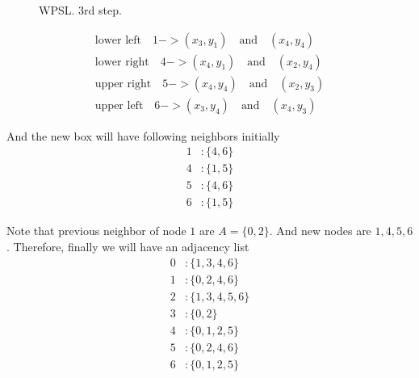 \documentclass[10pt,a4paper]{report}
\begin{document}
	\begin{figure}
		\centering
		\caption{WPSL. 3rd step.}
	\end{figure}

	\begin{align}
	\text{lower left}\quad 1 -> (x_3, y_1) \quad \text{and} \quad (x_4, y_4) \\		
	\text{lower right}\quad 4 -> (x_4, y_1) \quad \text{and} \quad (x_2, y_4) \\
	\text{upper right}\quad 	5 -> (x_4, y_4) \quad \text{and} \quad (x_2, y_3) \\
	\text{upper left}\quad		6 -> (x_3, y_4) \quad \text{and} \quad (x_4, y_3) 
	\end{align}
	
	And the new box will have following neighbors initially
	\begin{align}
	1 &: \{4, 6\} \\
	4 &: \{1, 5\} \\
	5 &: \{4, 6\} \\
	6 &: \{1, 5\}
	\end{align}
	
	Note that previous neighbor of node $1$ are $A=\{0, 2\}$. And new nodes are ${1,4,5,6}$. Therefore, finally we will have an adjacency list
	\begin{align}
		0 &: \{1, 3, 4, 6\} \\
		1 &: \{0, 2, 4, 6\} \\
		2 &: \{1, 3, 4, 5, 6\} \\
		3 &: \{0, 2\} \\
		4 &: \{0, 1, 2, 5\} \\
		5 &: \{0, 2, 4, 6\} \\
		6 &: \{0, 1, 2, 5\}
	\end{align}
	
\end{document}
